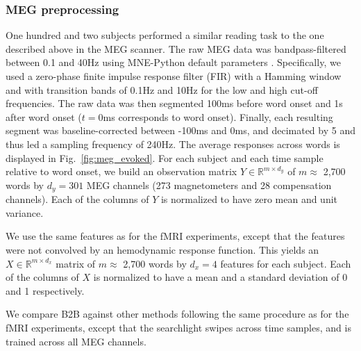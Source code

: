 
\subsubsection{MEG preprocessing}

One hundred and two subjects performed a similar reading task to the one
described above in the MEG scanner. The raw MEG data was bandpass-filtered between 0.1 and 40Hz using MNE-Python
default parameters \citep{gramfort2013meg, gramfort2014mne}. Specifically, we
used a zero-phase finite impulse
response filter (FIR) with a Hamming window and with transition bands of 0.1Hz
and 10Hz for the low and high cut-off frequencies. The raw data was then
segmented 100ms before word onset and 1s after
word onset ($t=0$ms corresponds to word onset). Finally, each resulting
segment was baseline-corrected between -100ms and 0ms, and decimated by 5 and
thus led a sampling frequency of 240Hz. The average responses across words is
displayed in Fig.~\ref{fig:meg_evoked}.
For each subject and each time sample relative to word onset, we
build an observation matrix $Y \in \mathbb{R}^{m \times d_y}$ of $m\approx$ 2,700 words
by $d_y=301$ MEG channels (273 magnetometers and 28 compensation channels). Each
of the columns of $Y$ is normalized to have zero mean and unit variance.

We use the same features as for the fMRI experiments, except that the features
were not convolved by an hemodynamic response function. This yields an $X \in \mathbb{R}^{m \times d_x}$
matrix of $m\approx$ 2,700 words by $d_x=4$ features for each subject. Each of
the columns of $X$ is normalized to have a mean and a standard deviation of 0
and 1 respectively.

We compare B2B against other methods following the same procedure as for the
fMRI experiments, except that the searchlight swipes across time samples, and
is trained across all MEG channels.


